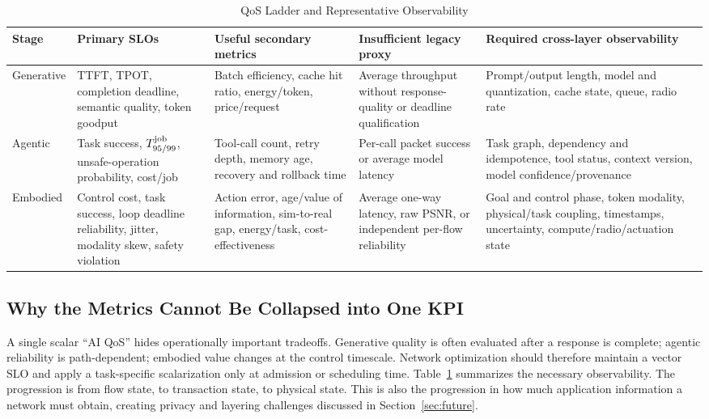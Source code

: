 \documentclass[letterpaper,journal]{IEEEtran}
\begin{document}
\begin{table}[t]
\caption{QoS Ladder and Representative Observability}
\label{tab:qos}
\centering
\footnotesize
\renewcommand{\arraystretch}{1.18}
\setlength{\tabcolsep}{3.2pt}
\begin{tabular}{|p{}|p{}|p{}|p{}|p{}|}
\hline
\textbf{Stage} & \textbf{Primary SLOs} & \textbf{Useful secondary metrics}
& \textbf{Insufficient legacy proxy} & \textbf{Required cross-layer
observability} \\ \hline
Generative &
TTFT, TPOT, completion deadline, semantic quality, token goodput &
Batch efficiency, cache hit ratio, energy/token, price/request &
Average throughput without response-quality or deadline qualification &
Prompt/output length, model and quantization, cache state, queue, radio rate
\\ \hline
Agentic &
Task success, $T_{95/99}^{\rm job}$, unsafe-operation probability, cost/job &
Tool-call count, retry depth, memory age, recovery and rollback time &
Per-call packet success or average model latency &
Task graph, dependency and idempotence, tool status, context version,
model confidence/provenance \\ \hline
Embodied &
Control cost, task success, loop deadline reliability, jitter, modality skew,
safety violation &
Action error, age/value of information, sim-to-real gap, energy/task,
cost-effectiveness &
Average one-way latency, raw PSNR, or independent per-flow reliability &
Goal and control phase, token modality, physical/task coupling, timestamps,
uncertainty, compute/radio/actuation state \\ \hline
\end{tabular}
\end{table}

\subsection{Why the Metrics Cannot Be Collapsed into One KPI}
A single scalar ``AI QoS'' hides operationally important tradeoffs.
Generative quality is often evaluated after a response is complete; agentic
reliability is path-dependent; embodied value changes at the control
timescale. Network optimization should therefore maintain a vector SLO and
apply a task-specific scalarization only at admission or scheduling time.
Table~\ref{tab:qos} summarizes the necessary observability. The progression is
from flow state, to transaction state, to physical state. This is also the
progression in how much application information a network must obtain,
creating privacy and layering challenges discussed in
Section~\ref{sec:future}.
\end{document}
